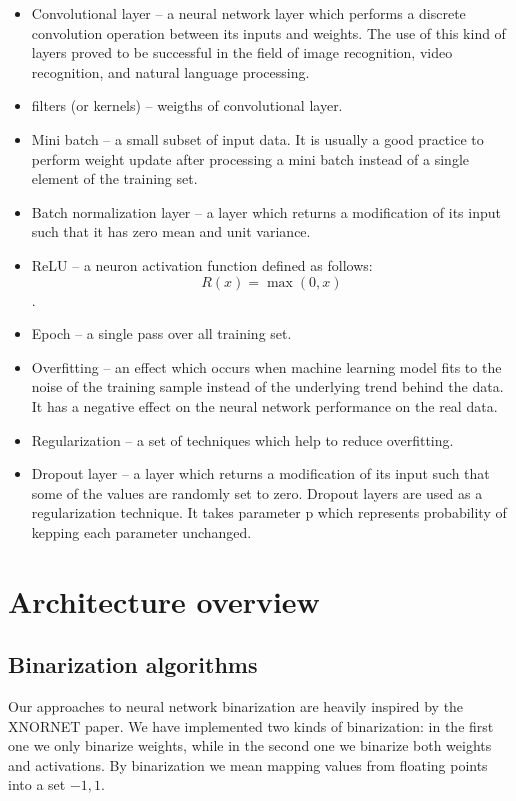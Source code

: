 \documentclass[licencjacka]{pracamgr}
\begin{document}
\begin{itemize}
        \item Convolutional layer -- a neural network layer which performs a discrete convolution operation between its inputs and weights. The use of this kind of layers proved to be successful in the field of image recognition, video recognition, and natural language processing. 	
         
        \item filters (or kernels) -- weigths of convolutional layer.

        \item Mini batch -- a small subset of input data. It is usually a good practice to perform weight update after processing a mini batch instead of a single element of the training set.
        
        \item Batch normalization layer -- a layer which returns a modification of its input such 
        that it has zero mean and unit variance.
        
        \item ReLU -- a neuron activation function defined as follows: $$ R(x) = \max(0,x) $$.
        
        \item Epoch -- a single pass over all training set.
        
        \item Overfitting -- an effect which occurs when machine learning model fits to the noise of the training sample instead of the underlying trend behind the data. It has a negative effect on the neural network performance on the real data.
        
        \item Regularization -- a set of techniques which help to reduce overfitting.
        
        \item Dropout layer -- a layer which returns a modification of its input such that some of the values are randomly set to zero. Dropout layers are used as a regularization technique. It takes parameter p which represents probability of kepping each parameter unchanged.  
    \end{itemize}

\part{Architecture overview}
\chapter{Binarization algorithms}
    Our approaches to neural network binarization are heavily inspired by the XNORNET paper. We have implemented two kinds of binarization: in the first one we only binarize weights, while in the second one we binarize both weights and activations. By binarization we mean mapping values from floating points into a set ${-1,1}$.
    
\end{document}
